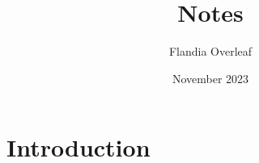 \documentclass{article}
\title{Notes}
\author{Flandia Overleaf}
\date{November 2023}
\begin{document}
\maketitle

\section{Introduction}
\end{document}

